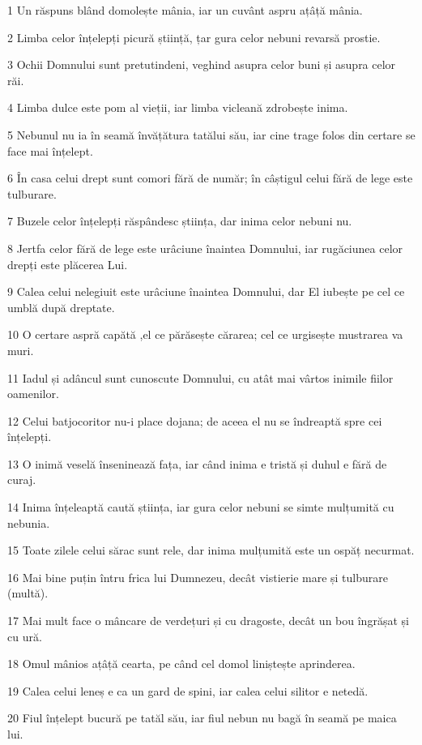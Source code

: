 \par 1 Un răspuns blând domolește mânia, iar un cuvânt aspru ațâță mânia.
\par 2 Limba celor înțelepți picură știință, țar gura celor nebuni revarsă prostie.
\par 3 Ochii Domnului sunt pretutindeni, veghind asupra celor buni și asupra celor răi.
\par 4 Limba dulce este pom al vieții, iar limba vicleană zdrobește inima.
\par 5 Nebunul nu ia în seamă învățătura tatălui său, iar cine trage folos din certare se face mai înțelept.
\par 6 În casa celui drept sunt comori fără de număr; în câștigul celui fără de lege este tulburare.
\par 7 Buzele celor înțelepți răspândesc știința, dar inima celor nebuni nu.
\par 8 Jertfa celor fără de lege este urâciune înaintea Domnului, iar rugăciunea celor drepți este plăcerea Lui.
\par 9 Calea celui nelegiuit este urâciune înaintea Domnului, dar El iubește pe cel ce umblă după dreptate.
\par 10 O certare aspră capătă ,el ce părăsește cărarea; cel ce urgisește mustrarea va muri.
\par 11 Iadul și adâncul sunt cunoscute Domnului, cu atât mai vârtos inimile fiilor oamenilor.
\par 12 Celui batjocoritor nu-i place dojana; de aceea el nu se îndreaptă spre cei înțelepți.
\par 13 O inimă veselă înseninează fața, iar când inima e tristă și duhul e fără de curaj.
\par 14 Inima înțeleaptă caută știința, iar gura celor nebuni se simte mulțumită cu nebunia.
\par 15 Toate zilele celui sărac sunt rele, dar inima mulțumită este un ospăț necurmat.
\par 16 Mai bine puțin întru frica lui Dumnezeu, decât vistierie mare și tulburare (multă).
\par 17 Mai mult face o mâncare de verdețuri și cu dragoste, decât un bou îngrășat și cu ură.
\par 18 Omul mânios ațâță cearta, pe când cel domol liniștește aprinderea.
\par 19 Calea celui leneș e ca un gard de spini, iar calea celui silitor e netedă.
\par 20 Fiul înțelept bucură pe tatăl său, iar fiul nebun nu bagă în seamă pe maica lui.

